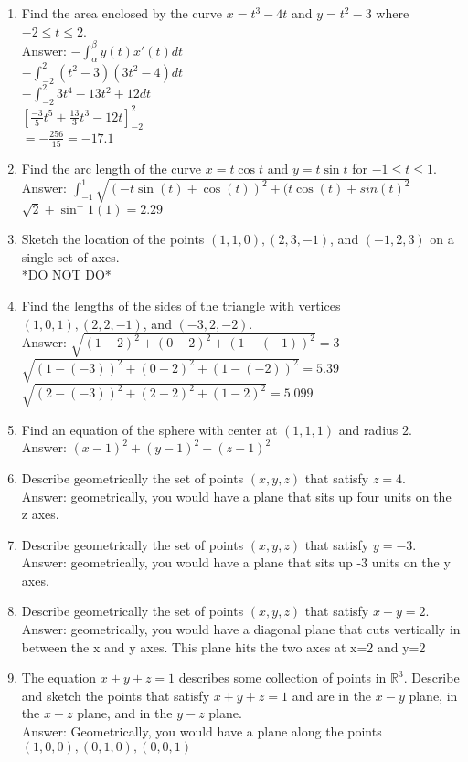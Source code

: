\documentclass[11pt]{article}
\begin{document}
\begin{enumerate}
\item  Find the area enclosed by the curve $x=t^3 - 4t$ and $y=t^2-3$ where $-2 \le t \le 2$.
\\
Answer: $- \int_{\alpha}^{\beta} y(t) x'(t) dt$
\\
$- \int_{-2}^{2} (t^2-3)(3t^2-4) dt$
\\
$- \int_{-2}^{2} 3t^4-13t^2+12 dt$
\\
$[\frac{-3}{5}t^5+\frac{13}{3}t^3-12t]_{-2}^{2}$
\\
$= -\frac{256}{15}=-17.1$



\item Find the arc length of the curve $x=t \cos t$ and $y = t \sin t$ for $-1 \le t \le 1$.  
\\
Answer: $\int_{-1}^{1} \sqrt{(-t\sin(t)+\cos(t))^2+(t\cos (t) + sin (t)^2}$
\\
$\sqrt{2}+\sin^-1(1)=2.29$


\item Sketch the location of the points $(1, 1, 0), (2, 3, -1)$, and $(-1, 2, 3)$ on a single set of axes.
\\
*DO NOT DO*


\item Find the lengths of the sides of the triangle with vertices $(1, 0, 1), (2, 2, -1)$, and $(-3, 2, -2)$.
\\
Answer:
$\sqrt{(1-2)^2+(0-2)^2+(1-(-1))^2}=3$
\\
$\sqrt{(1-(-3))^2+(0-2)^2+(1-(-2))^2}=5.39$
\\
$\sqrt{(2-(-3))^2+(2-2)^2+(1-2)^2}=5.099$



\item Find an equation of the sphere with center at $(1, 1, 1)$ and radius $2$. 
\\
Answer: $(x-1)^2+(y-1)^2+(z-1)^2$


\item Describe geometrically the set of points $(x, y, z)$ that satisfy $z = 4$.
\\
Answer: geometrically, you would have a plane that sits up four units on the z axes.
\item Describe geometrically the set of points $(x, y, z)$ that satisfy $y = -3$.
\\
Answer: geometrically, you would have a plane that sits up -3 units on the y axes.
\item Describe geometrically the set of points $(x, y, z)$ that satisfy $x + y = 2$.
\\
Answer: geometrically, you would have a diagonal plane that cuts vertically in between the x and y axes. This plane hits the two axes at x=2 and y=2
\item The equation $x + y + z = 1$ describes some collection of points in $\mathbb{R}^3$. Describe and sketch the points that satisfy $x + y + z = 1$ and are in the $x-y$ plane, in the $x-z$ plane, and in the $y-z$ plane.
\\
Answer: Geometrically, you would have a plane along the points $(1,0,0),(0,1,0),(0,0,1)$




\end{enumerate}
\end{document}
